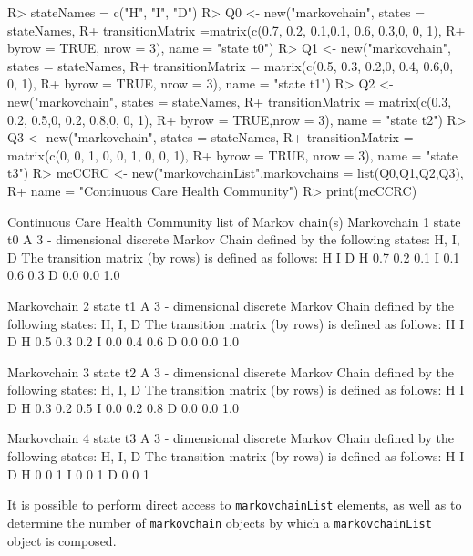 \documentclass[
  nojss]{jss}
\begin{document}
\begin{CodeChunk}

\begin{CodeInput}
R> stateNames = c("H", "I", "D")
R> Q0 <- new("markovchain", states = stateNames, 
R+         transitionMatrix =matrix(c(0.7, 0.2, 0.1,0.1, 0.6, 0.3,0, 0, 1), 
R+         byrow = TRUE, nrow = 3), name = "state t0")
R> Q1 <- new("markovchain", states = stateNames, 
R+         transitionMatrix = matrix(c(0.5, 0.3, 0.2,0, 0.4, 0.6,0, 0, 1), 
R+         byrow = TRUE, nrow = 3), name = "state t1")
R> Q2 <- new("markovchain", states = stateNames, 
R+         transitionMatrix = matrix(c(0.3, 0.2, 0.5,0, 0.2, 0.8,0, 0, 1), 
R+         byrow = TRUE,nrow = 3), name = "state t2")
R> Q3 <- new("markovchain", states = stateNames, 
R+           transitionMatrix = matrix(c(0, 0, 1, 0, 0, 1, 0, 0, 1), 
R+         byrow = TRUE, nrow = 3), name = "state t3")
R> mcCCRC <- new("markovchainList",markovchains = list(Q0,Q1,Q2,Q3), 
R+       name = "Continuous Care Health Community")
R> print(mcCCRC)
\end{CodeInput}

\begin{CodeOutput}
Continuous Care Health Community  list of Markov chain(s) 
Markovchain  1 
state t0 
 A  3 - dimensional discrete Markov Chain defined by the following states: 
 H, I, D 
 The transition matrix  (by rows)  is defined as follows: 
    H   I   D
H 0.7 0.2 0.1
I 0.1 0.6 0.3
D 0.0 0.0 1.0

Markovchain  2 
state t1 
 A  3 - dimensional discrete Markov Chain defined by the following states: 
 H, I, D 
 The transition matrix  (by rows)  is defined as follows: 
    H   I   D
H 0.5 0.3 0.2
I 0.0 0.4 0.6
D 0.0 0.0 1.0

Markovchain  3 
state t2 
 A  3 - dimensional discrete Markov Chain defined by the following states: 
 H, I, D 
 The transition matrix  (by rows)  is defined as follows: 
    H   I   D
H 0.3 0.2 0.5
I 0.0 0.2 0.8
D 0.0 0.0 1.0

Markovchain  4 
state t3 
 A  3 - dimensional discrete Markov Chain defined by the following states: 
 H, I, D 
 The transition matrix  (by rows)  is defined as follows: 
  H I D
H 0 0 1
I 0 0 1
D 0 0 1
\end{CodeOutput}
\end{CodeChunk}

It is possible to perform direct access to \texttt{markovchainList} elements, as well as to determine the number of \texttt{markovchain} objects by which a \texttt{markovchainList} object is composed.
\end{document}
